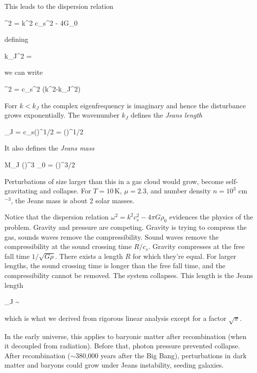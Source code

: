 This leads to the dispersion relation

\beq
\omega^2  = k^2 c_s^2 - 4\pi G\rho_0 
\eeq

defining

\beq
k_J^2\equiv {} = 
\eeq

we can write

\beq
\omega^2  = c_s^2 \left(k^2-k_J^2\right)
\eeq


Forr $k < k_J$ the complex eigenfrequency is imaginary and hence the
disturbance grows exponentially. The wavenumber $k_J$ defines the
{\it Jeans length}

\beq
\lambda_J \equiv {} = c_s\left(\right)^{1/2} = \left(\right)^{1/2}
\eeq

It also defines the {\it Jeans mass}

\beq
M_J \equiv  \left(\right)^3 \rho_0 = \left(\right)^{3/2} 
\eeq

Perturbations of size larger than this in a gas cloud would grow,
become self-gravitating and collapse. For $T=10$\,K, $\mu= 2.3$, and
number density $n = 10^3$ cm$^{-3}$, the Jeans mass is about 2 solar
masses. 

Notice that the dispersion relation $\omega^2  =  k^2 c_s^2 - 4\pi
G\rho_0  $ evidences the physics of the problem. Gravity and pressure
are competing. Gravity is trying to compress the gas, sounds waves
remove the compressibility. Sound waves remove the compressibility at
the sound crossing time $R/c_s$. Gravity compresses at the free fall
time $1/\sqrt{G\rho}$. There exists a length $R$ for which they're
equal. For larger lengths, the sound crossing time is longer than the
free fall time, and the compressibility cannot be removed. The system
collapses. This length is the Jeans length

\beq
\lambda_J \sim {}
\eeq

which is what we derived from rigorous linear analysis except for a
factor $\sqrt{\pi}$.


In the early universe, this applies to baryonic matter after recombination (when it decoupled from radiation). Before that, photon pressure prevented collapse. After recombination ($\sim$380,000 years after the Big Bang), perturbations in dark matter and baryons could grow under Jeans instability, seeding galaxies.


